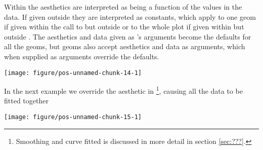 \documentclass[paper=a4,10pt,div=17,headsepline,BCOR=12mm,twoside,open=right]{scrbook}\usepackage{knitr}
\begin{document}
Within  the aesthetics are interpreted as being a function of the values in the data. If given outside  they are interpreted as constants, which apply to one geom if given within the call to  but outside  or to the whole plot if given within  but outside . The aesthetics and data given as 's arguments become the defaults for all the geoms, but geoms also accept aesthetics and data as arguments, which when supplied as arguments override the defaults.

\begin{knitrout}\footnotesize
{}\color{fgcolor}\begin{kframe}
\begin{alltt}
 \hlstd{(}     \hlstd{=}  \hlopt{+}
  \hlstd{(}\hlstd{=}\hlstd{,} \hlstd{=}\hlstd{)}
\end{alltt}
\end{kframe}

{\centering \texttt{[image: figure/pos-unnamed-chunk-14-1]} 

}



\end{knitrout}

In the next example we override the  aesthetic in \footnote{Smoothing and curve fitted is discussed in more detail in section \ref{sec:???}.}, causing all the data to be fitted together

\begin{knitrout}\footnotesize
{}\color{fgcolor}\begin{kframe}
\begin{alltt}
 \hlstd{(}  \hlstd{=} \hlopt{+} \hlstd{()} \hlopt{+}
  \hlstd{(}\hlstd{=}\hlstd{)}
\end{alltt}
\end{kframe}

{\centering \texttt{[image: figure/pos-unnamed-chunk-15-1]} 

}



\end{knitrout}
\end{document}
